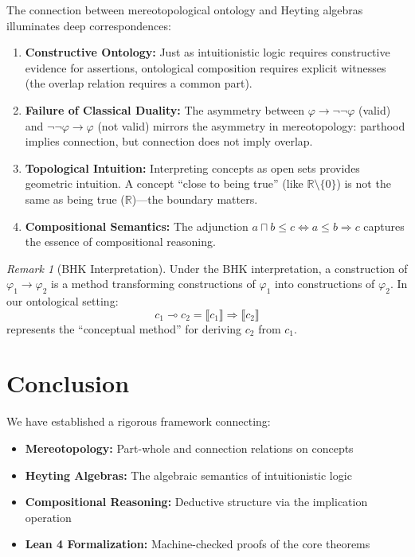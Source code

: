 \documentclass[12pt,a4paper]{article}
\theoremstyle{definition}
\theoremstyle{plain}
\theoremstyle{remark}
\newtheorem{observacao}[definicao]{Remark}
\newcommand{\sem}[1]{\llbracket #1 \rrbracket}
\begin{document}
The connection between mereotopological ontology and Heyting algebras illuminates deep correspondences:

\begin{enumerate}
    \item \textbf{Constructive Ontology:} Just as intuitionistic logic requires constructive evidence for assertions, ontological composition requires explicit witnesses (the overlap relation requires a common part).
    
    \item \textbf{Failure of Classical Duality:} The asymmetry between $\varphi \to \neg\neg\varphi$ (valid) and $\neg\neg\varphi \to \varphi$ (not valid) mirrors the asymmetry in mereotopology: parthood implies connection, but connection does not imply overlap.
    
    \item \textbf{Topological Intuition:} Interpreting concepts as open sets provides geometric intuition. A concept ``close to being true'' (like $\mathbb{R} \setminus \{0\}$) is not the same as being true ($\mathbb{R}$)---the boundary matters.
    
    \item \textbf{Compositional Semantics:} The adjunction $a \sqcap b \leq c \Leftrightarrow a \leq b \Rightarrow c$ captures the essence of compositional reasoning.
\end{enumerate}

\begin{observacao}[BHK Interpretation]
Under the BHK interpretation, a construction of $\varphi_1 \to \varphi_2$ is a method transforming constructions of $\varphi_1$ into constructions of $\varphi_2$. In our ontological setting:
$$
c_1 \multimap c_2 = \sem{c_1} \Rightarrow \sem{c_2}
$$
represents the ``conceptual method'' for deriving $c_2$ from $c_1$.
\end{observacao}

\section{Conclusion}

We have established a rigorous framework connecting:
\begin{itemize}
    \item \textbf{Mereotopology:} Part-whole and connection relations on concepts
    \item \textbf{Heyting Algebras:} The algebraic semantics of intuitionistic logic
    \item \textbf{Compositional Reasoning:} Deductive structure via the implication operation
    \item \textbf{Lean 4 Formalization:} Machine-checked proofs of the core theorems
\end{itemize}
\end{document}
